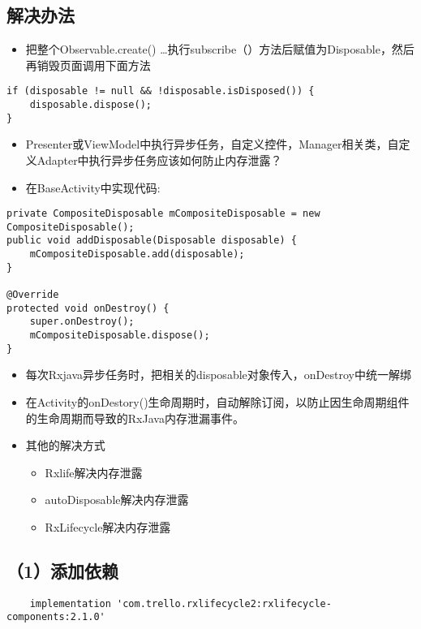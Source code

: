 \documentclass[9pt, b5paper]{article}
\begin{document}
\subsection{解决办法}
\label{sec-19-2}
\begin{itemize}
\item 把整个Observable.create() \ldots{}执行subscribe（）方法后赋值为Disposable，然后再销毁页面调用下面方法
\end{itemize}
\begin{verbatim}
if (disposable != null && !disposable.isDisposed()) {
    disposable.dispose();
}
\end{verbatim}
\begin{itemize}
\item Presenter或ViewModel中执行异步任务，自定义控件，Manager相关类，自定义Adapter中执行异步任务应该如何防止内存泄露？
\item 在BaseActivity中实现代码:
\end{itemize}
\begin{verbatim}
private CompositeDisposable mCompositeDisposable = new CompositeDisposable();
public void addDisposable(Disposable disposable) {
    mCompositeDisposable.add(disposable);
}

@Override
protected void onDestroy() {
    super.onDestroy();
    mCompositeDisposable.dispose();
}
\end{verbatim}
\begin{itemize}
\item 每次Rxjava异步任务时，把相关的disposable对象传入，onDestroy中统一解绑
\item 在Activity的onDestory()生命周期时，自动解除订阅，以防止因生命周期组件的生命周期而导致的RxJava内存泄漏事件。
\item 其他的解决方式
\begin{itemize}
\item Rxlife解决内存泄露
\item autoDisposable解决内存泄露
\item RxLifecycle解决内存泄露
\end{itemize}
\end{itemize}

\subsection{（1）添加依赖}
\label{sec-19-3}
\begin{verbatim}
    implementation 'com.trello.rxlifecycle2:rxlifecycle-components:2.1.0'
\end{verbatim}
\end{document}

